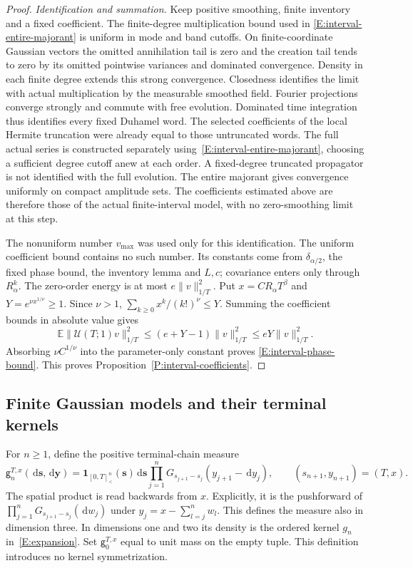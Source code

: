 \documentclass[12pt]{article}
\numberwithin{equation}{section}
\theoremstyle{definition}
\newcommand{\E}{\mathbb{E}}
\newcommand{\ud}{\,\mathrm{d}}
\begin{document}
\begin{proof}
  \emph{Identification and summation.}
  Keep positive smoothing, finite inventory and a fixed coefficient.
  The finite-degree multiplication bound used in
  \eqref{E:interval-entire-majorant} is uniform in mode and band cutoffs.
  On finite-coordinate Gaussian vectors the omitted annihilation tail is
  zero and the creation tail tends to zero by its omitted pointwise
  variances and dominated convergence. Density in each finite degree
  extends this strong convergence. Closedness identifies the limit with
  actual multiplication by the measurable smoothed field.
  Fourier projections converge strongly and commute with free evolution.
  Dominated time integration thus identifies every fixed Duhamel word.
  The selected coefficients of the local Hermite truncation were already
  equal to those untruncated words. The full actual series is constructed
  separately using~\eqref{E:interval-entire-majorant}, choosing a sufficient
  degree cutoff anew at each order. A fixed-degree truncated propagator
  is not identified with the full evolution.
  The entire majorant gives convergence uniformly on compact amplitude
  sets. The coefficients estimated above are therefore those of the
  actual finite-interval model, with no zero-smoothing limit at this step.

  The nonuniform number $v_{\max}$ was used only for this identification.
  The uniform coefficient bound contains no such number. Its constants
  come from $\delta_{\alpha/2}$, the fixed phase bound, the inventory
  lemma and $L,c$; covariance enters only through $R_\alpha^k$.
  The zero-order energy is at most $e\|v\|_{1/T}^2$.
  Put $x=CR_\alpha T^\beta$ and $Y=e^{\nu x^{1/\nu}}\ge1$.
  Since $\nu>1$, $\sum_{k\ge0}x^k/(k!)^\nu\le Y$.
  Summing the coefficient bounds in absolute value gives
  \[
    \E\|\mathcal U(T;1)v\|_{1/T}^2
    \le(e+Y-1)\|v\|_{1/T}^2\le eY\|v\|_{1/T}^2.
  \]
  Absorbing $\nu C^{1/\nu}$ into the parameter-only constant proves
  \eqref{E:interval-phase-bound}. This proves
  Proposition~\ref{P:interval-coefficients}.
\end{proof}

\subsection{Finite Gaussian models and their terminal kernels}

For $n\ge1$, define the positive terminal-chain measure
\begin{equation}\label{E:terminal-chain-measure}
  \mathsf g_n^{T,x}(\ud\boldsymbol s,\ud\boldsymbol y)
  =\mathbf1_{[0,T]^n_<}(\boldsymbol s)\ud\boldsymbol s
  \prod_{j=1}^n
  G_{s_{j+1}-s_j}(y_{j+1}-\ud y_j),
  \qquad (s_{n+1},y_{n+1})=(T,x).
\end{equation}
The spatial product is read backwards from $x$. Explicitly, it is the
pushforward of $\prod_{j=1}^nG_{s_{j+1}-s_j}(\ud w_j)$ under
$y_j=x-\sum_{l=j}^n w_l$. This defines the measure also in dimension
three. In dimensions one and two its density is the ordered kernel
$g_n$ in~\eqref{E:expansion}. Set $\mathsf g_0^{T,x}$ equal to unit mass
on the empty tuple. This definition introduces no kernel symmetrization.
\end{document}
